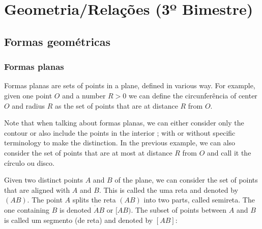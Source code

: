 \chapter{Geometria/Relações (3º Bimestre)}

\section{Formas geométricas}

\subsection*{Formas planas}

Formas planas are sets of points in a plane, defined in various way.
For example, given one point $O$ and a number $R > 0$ we can define the
circunferência
of center $O$ and radius $R$ as the set of points that are at distance $R$ from
$O$.

\begin{center}
\end{center}

Note that when talking about formas planas, we can either consider only
the contour or also include the points in the interior ; with or without
specific terminology to make the distinction. In the previous example, we can
also consider the set of points that are at most at distance $R$ from $O$ and
call it the círculo ou disco.

Given two distinct
points $A$ and $B$ of the plane, we can consider the set of points
that are aligned with $A$ and $B$. This is called the uma reta and denoted
by $(AB)$. The point $A$ splits the reta $(AB)$ into two parts, called
semireta. The one containing $B$ is denoted ${\dot{A}B}$ or $[AB)$. The
subset of points between $A$ and $B$ is called um segmento (de reta) and
denoted by $[AB]$:

